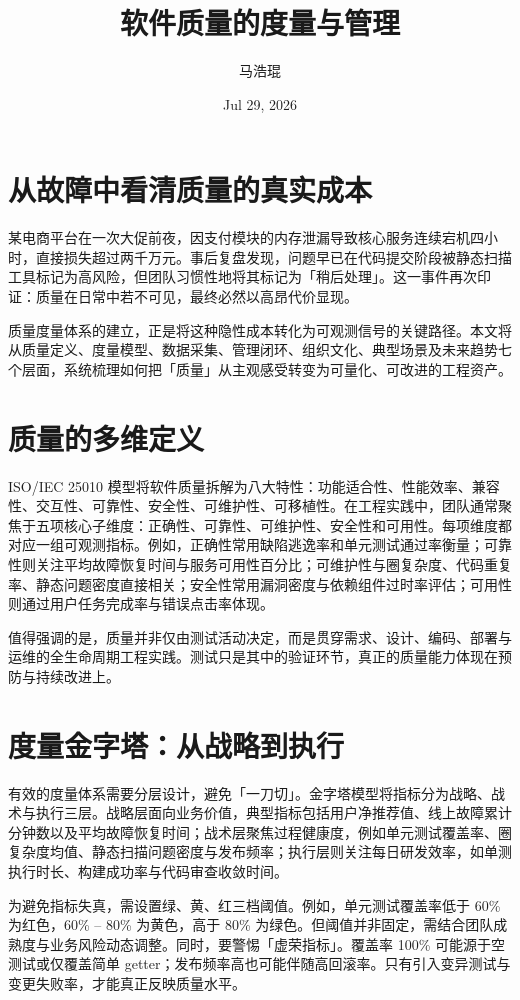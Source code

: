\title{软件质量的度量与管理}
\author{马浩琨}
\date{Jul 29, 2026}
\maketitle
\chapter{从故障中看清质量的真实成本}
某电商平台在一次大促前夜，因支付模块的内存泄漏导致核心服务连续宕机四小时，直接损失超过两千万元。事后复盘发现，问题早已在代码提交阶段被静态扫描工具标记为高风险，但团队习惯性地将其标记为「稍后处理」。这一事件再次印证：质量在日常中若不可见，最终必然以高昂代价显现。\par
质量度量体系的建立，正是将这种隐性成本转化为可观测信号的关键路径。本文将从质量定义、度量模型、数据采集、管理闭环、组织文化、典型场景及未来趋势七个层面，系统梳理如何把「质量」从主观感受转变为可量化、可改进的工程资产。\par
\chapter{质量的多维定义}
ISO/IEC 25010 模型将软件质量拆解为八大特性：功能适合性、性能效率、兼容性、交互性、可靠性、安全性、可维护性、可移植性。在工程实践中，团队通常聚焦于五项核心子维度：正确性、可靠性、可维护性、安全性和可用性。每项维度都对应一组可观测指标。例如，正确性常用缺陷逃逸率和单元测试通过率衡量；可靠性则关注平均故障恢复时间与服务可用性百分比；可维护性与圈复杂度、代码重复率、静态问题密度直接相关；安全性常用漏洞密度与依赖组件过时率评估；可用性则通过用户任务完成率与错误点击率体现。\par
值得强调的是，质量并非仅由测试活动决定，而是贯穿需求、设计、编码、部署与运维的全生命周期工程实践。测试只是其中的验证环节，真正的质量能力体现在预防与持续改进上。\par
\chapter{度量金字塔：从战略到执行}
有效的度量体系需要分层设计，避免「一刀切」。金字塔模型将指标分为战略、战术与执行三层。战略层面向业务价值，典型指标包括用户净推荐值、线上故障累计分钟数以及平均故障恢复时间；战术层聚焦过程健康度，例如单元测试覆盖率、圈复杂度均值、静态扫描问题密度与发布频率；执行层则关注每日研发效率，如单测执行时长、构建成功率与代码审查收敛时间。\par
为避免指标失真，需设置绿、黄、红三档阈值。例如，单元测试覆盖率低于 60\%{} 为红色，60\%{} – 80\%{} 为黄色，高于 80\%{} 为绿色。但阈值并非固定，需结合团队成熟度与业务风险动态调整。同时，要警惕「虚荣指标」。覆盖率 100\%{} 可能源于空测试或仅覆盖简单 getter；发布频率高也可能伴随高回滚率。只有引入变异测试与变更失败率，才能真正反映质量水平。\par
